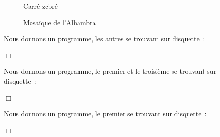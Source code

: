 \begin{figure}[htbp]
 \caption{Carré zébré}\label{fig:carzeb}
\end{figure}
\begin{figure}[htbp]
 \caption{Mosaïque de l'Alhambra}\label{fig:mosaic6}
\end{figure}
\begin{corrige}{
Nous donnons un programme, les autres se trouvant sur disquette~:

\noindent $\Box$}\end{corrige}
\begin{corrige}{
Nous donnons un programme, le premier et le trois\-ième se trouvant sur disquette~:

\noindent $\Box$}\end{corrige}
\begin{corrige}{
Nous donnons un programme, le premier se trouvant sur disquette~:

\noindent $\Box$}\end{corrige}

